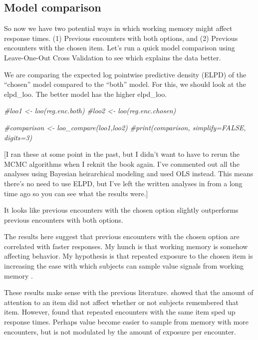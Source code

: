 \documentclass[
]{book}
\newenvironment{Shaded}{\begin{snugshade}}{\end{snugshade}}
\newcommand{\CommentTok}[1]{\textcolor[rgb]{0.56,0.35,0.01}{\textit{#1}}}
\begin{document}
\hypertarget{model-comparison}{%
\subsection{Model comparison}\label{model-comparison}}

So now we have two potential ways in which working memory might affect response times. (1) Previous encounters with both options, and (2) Previous encounters with the chosen item. Let's run a quick model comparison using Leave-One-Out Cross Validation to see which explains the data better.

We are comparing the expected log pointwise predictive density (ELPD) of the ``chosen'' model compared to the ``both'' model. For this, we should look at the elpd\_loo. The better model has the higher elpd\_loo.

\begin{Shaded}
\begin{Highlighting}[]
\CommentTok{\#loo1 \textless{}{-} loo(reg.enc.both)}
\CommentTok{\#loo2 \textless{}{-} loo(reg.enc.chosen)}

\CommentTok{\#comparison \textless{}{-} loo\_compare(loo1,loo2)}
\CommentTok{\#print(comparison, simplify=FALSE, digits=3)}
\end{Highlighting}
\end{Shaded}

{[}I ran these at some point in the past, but I didn't want to have to rerun the MCMC algorithms when I reknit the book again. I've commented out all the analyses using Bayesian heirarchical modeling and used OLS instead. This means there's no need to use ELPD, but I've left the written analyses in from a long time ago so you can see what the results were.{]}

It looks like previous encounters with the chosen option slightly outperforms previous encounters with both options.

The results here suggest that previous encounters with the chosen option are correlated with faster responses. My hunch is that working memory is somehow affecting behavior. My hypothesis is that repeated exposure to the chosen item is increasing the ease with which subjects can sample value signals from working memory \citep{weilbacher2021}.

These results make sense with the previous literature. \citep{weilbacher2021} showed that the amount of attention to an item did not affect whether or not subjects remembered that item. However, \citep{agranov2017} found that repeated encounters with the same item sped up response times. Perhaps value become easier to sample from memory with more encounters, but is not modulated by the amount of exposure per encounter.
\end{document}
